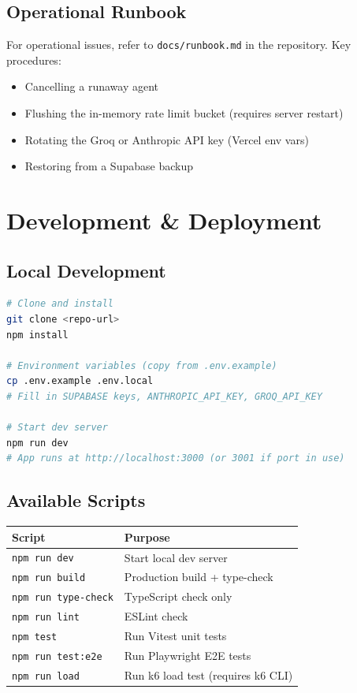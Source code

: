 \documentclass[11pt, a4paper]{article}
\begin{document}
\subsection{Operational Runbook}

For operational issues, refer to \texttt{docs/runbook.md} in the repository. Key procedures:
\begin{itemize}
  \item Cancelling a runaway agent
  \item Flushing the in-memory rate limit bucket (requires server restart)
  \item Rotating the Groq or Anthropic API key (Vercel env vars)
  \item Restoring from a Supabase backup
\end{itemize}

\section{Development \& Deployment}

\subsection{Local Development}

\begin{lstlisting}[language=bash]
# Clone and install
git clone <repo-url>
npm install

# Environment variables (copy from .env.example)
cp .env.example .env.local
# Fill in SUPABASE keys, ANTHROPIC_API_KEY, GROQ_API_KEY

# Start dev server
npm run dev
# App runs at http://localhost:3000 (or 3001 if port in use)
\end{lstlisting}

\subsection{Available Scripts}

\begin{center}
\begin{tabular}{ll}
  \toprule
  \textbf{Script} & \textbf{Purpose} \\
  \midrule
  \texttt{npm run dev}          & Start local dev server \\
  \texttt{npm run build}        & Production build + type-check \\
  \texttt{npm run type-check}   & TypeScript check only \\
  \texttt{npm run lint}         & ESLint check \\
  \texttt{npm test}             & Run Vitest unit tests \\
  \texttt{npm run test:e2e}     & Run Playwright E2E tests \\
  \texttt{npm run load}         & Run k6 load test (requires k6 CLI) \\
  \bottomrule
\end{tabular}
\end{center}
\end{document}
